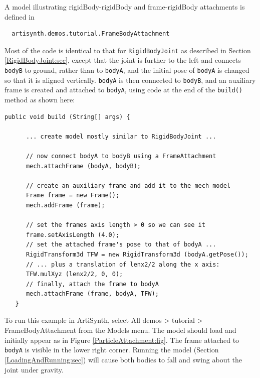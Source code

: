 A model illustrating rigidBody-rigidBody and frame-rigidBody attachments
is defined in
%
\begin{verbatim}
  artisynth.demos.tutorial.FrameBodyAttachment
\end{verbatim}
%
Most of the code is identical to that for {\tt RigidBodyJoint}
as described in Section \ref{RigidBodyJoint:sec}, except that
the joint is further to the left and connects {\tt bodyB} to ground,
rather than to {\tt bodyA}, and the initial pose of {\tt bodyA}
is changed so that it is aligned vertically. {\tt bodyA} is
then connected to {\tt bodyB}, and an auxiliary frame is created
and attached to {\tt bodyA}, using code at the end
of the {\tt build()} method as shown here:
%
\lstset{numbers=left}
\begin{lstlisting}[]
   public void build (String[] args) {

      ... create model mostly similar to RigidBodyJoint ...

      // now connect bodyA to bodyB using a FrameAttachment
      mech.attachFrame (bodyA, bodyB);

      // create an auxiliary frame and add it to the mech model
      Frame frame = new Frame();
      mech.addFrame (frame);
      
      // set the frames axis length > 0 so we can see it
      frame.setAxisLength (4.0); 
      // set the attached frame's pose to that of bodyA ...
      RigidTransform3d TFW = new RigidTransform3d (bodyA.getPose());
      // ... plus a translation of lenx2/2 along the x axis:
      TFW.mulXyz (lenx2/2, 0, 0);
      // finally, attach the frame to bodyA
      mech.attachFrame (frame, bodyA, TFW);
   }
\end{lstlisting}
\lstset{numbers=none}
%
To run this example in ArtiSynth, select {\sf All demos > tutorial >
FrameBodyAttachment} from the {\sf Models} menu. The model should load
and initially appear as in Figure \ref{ParticleAttachment:fig}.  The
frame attached to {\tt bodyA} is visible in the lower right corner.
Running the model (Section \ref{LoadingAndRunning:sec}) will cause
both bodies to fall and swing about the joint under gravity.

